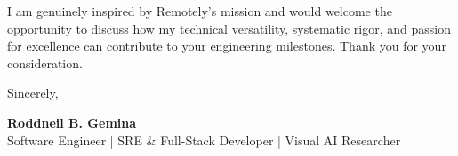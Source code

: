 \documentclass[letterpaper,11pt]{article}
\begin{document}
I am genuinely inspired by Remotely's mission and would welcome the opportunity to discuss how my technical versatility, systematic rigor, and passion for excellence can contribute to your engineering milestones. Thank you for your consideration.

Sincerely,

\vspace{12pt}
\textbf{Roddneil B. Gemina} \\
Software Engineer | SRE \& Full-Stack Developer | Visual AI Researcher
\end{document}
